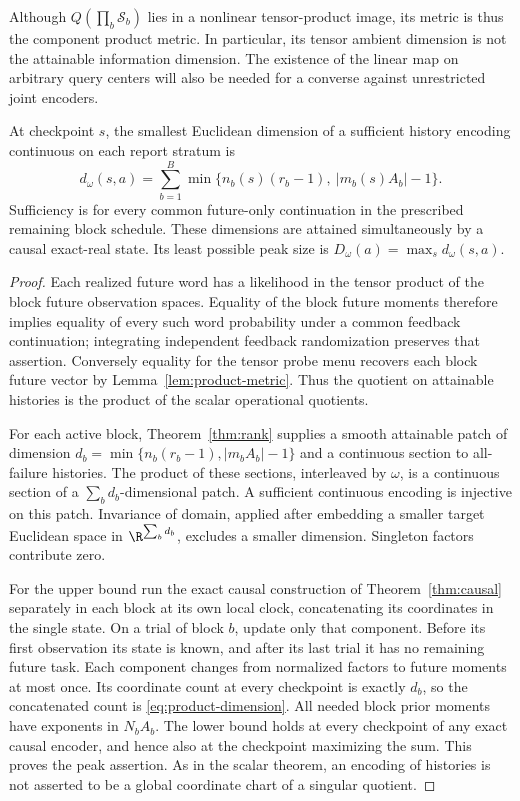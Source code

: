 Although $Q(\prod_b\mathcal S_b)$ lies in a nonlinear tensor-product
image, its metric is thus the component product metric. In particular,
its tensor ambient dimension is not the attainable information dimension.
The existence of the linear map on arbitrary query centers will also be
needed for a converse against unrestricted joint encoders.

\begin{theorem}\label{thm:product-dimension}
At checkpoint $s$, the smallest Euclidean dimension of a sufficient
history encoding continuous on each report stratum is
\begin{equation}\label{eq:product-dimension}
 d_\omega(s,a)=\sum_{b=1}^B
       \min\{n_b(s)(r_b-1),\ |m_b(s)A_b|-1\}.
\end{equation}
Sufficiency is for every common future-only continuation in the prescribed
remaining block schedule. These dimensions are attained simultaneously
by a causal exact-real state. Its least possible peak size is
$D_\omega(a)=\max_s d_\omega(s,a)$.
\end{theorem}
\begin{proof}
Each realized future word has a likelihood in the tensor product of the
block future observation spaces. Equality of the block future moments
therefore implies equality of every such word probability under a common
feedback continuation; integrating independent feedback randomization
preserves that assertion. Conversely equality for the tensor probe menu
recovers each block future vector by Lemma~\ref{lem:product-metric}.
Thus the quotient on attainable histories is the product of the scalar
operational quotients.

For each active block, Theorem~\ref{thm:rank} supplies a smooth attainable
patch of dimension $d_b=\min\{n_b(r_b-1),|m_bA_b|-1\}$ and a continuous
section to all-failure histories. The product of these sections, interleaved
by $\omega$, is a continuous section of a $\sum_b d_b$-dimensional patch.
A sufficient continuous encoding is injective on this patch. Invariance
of domain, applied after embedding a smaller target Euclidean space in
$\R^{\sum_b d_b}$, excludes a smaller dimension. Singleton factors
contribute zero.

For the upper bound run the exact causal construction of
Theorem~\ref{thm:causal} separately in each block at its own local clock,
concatenating its coordinates in the single state. On a trial of block
$b$, update only that component. Before its first observation its state
is known, and after its last trial it has no remaining future task.
Each component changes from normalized factors to future moments at
most once. Its coordinate count at every checkpoint is exactly $d_b$,
so the concatenated count is \eqref{eq:product-dimension}. All needed
block prior moments have exponents in $N_bA_b$. The lower bound holds
at every checkpoint of any exact causal encoder, and hence also at the
checkpoint maximizing the sum. This proves the peak assertion. As in
the scalar theorem, an encoding of histories is not asserted to be a
global coordinate chart of a singular quotient.
\end{proof}

